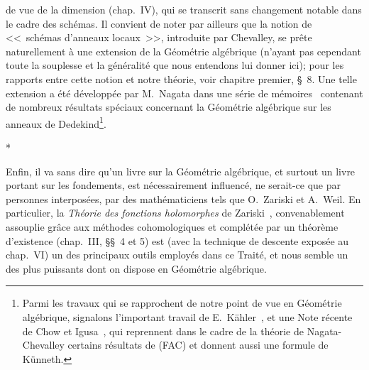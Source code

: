 de vue de la dimension (chap.~IV), qui se transcrit sans changement notable dans le cadre des schémas.
Il convient de noter par ailleurs que la notion de <<~schémas d'anneaux locaux~>>, introduite par Chevalley, se prête naturellement à une extension de la Géométrie algébrique (n'ayant pas cependant toute la souplesse et la généralité que nous entendons lui donner ici); pour les rapports entre cette notion et notre théorie, voir chapitre premier, \S~8.
Une telle extension a été développée par M.~Nagata dans une série de mémoires~\cite{I-9} contenant de nombreux résultats spéciaux concernant la Géométrie algébrique sur les anneaux de Dedekind\footnote{Parmi les travaux qui se rapprochent de notre point de vue en Géométrie algébrique, signalons l'important travail de E.~Kähler~\cite{I-22}, et une Note récente de Chow et Igusa~\cite{I-3}, qui reprennent dans le cadre de la théorie de Nagata-Chevalley certains résultats de (FAC) et donnent aussi une formule de Künneth.}.

\bigskip
\begin{center}*\quad*\quad*\end{center}
\bigskip

Enfin, il va sans dire qu'un livre sur la Géométrie algébrique, et surtout un livre portant sur les fondements, est nécessairement influencé, ne serait-ce que par personnes interposées, par des mathématiciens tels que O.~Zariski et A.~Weil.
En particulier, la \emph{Théorie des fonctions holomorphes} de Zariski~\cite{I-20}, convenablement assouplie grâce aux méthodes cohomologiques et complétée par un théorème d'existence (chap.~III, \S\S~4 et 5) est (avec la technique de descente exposée au chap.~VI) un des principaux outils employés dans ce Traité, et nous semble un des plus puissants dont on dispose en Géométrie algébrique.

